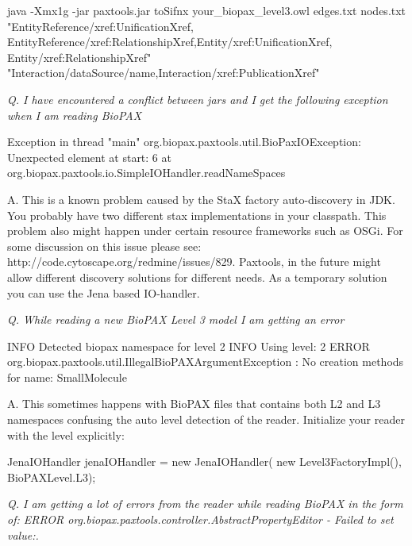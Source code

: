 \documentclass{tufte-book}
\begin{document}
\begin{xmlcode}
java -Xmx1g -jar paxtools.jar toSifnx your_biopax_level3.owl 
 edges.txt nodes.txt  "EntityReference/xref:UnificationXref,
EntityReference/xref:RelationshipXref,Entity/xref:UnificationXref,
Entity/xref:RelationshipXref"  
"Interaction/dataSource/name,Interaction/xref:PublicationXref"
\end{xmlcode}

\textit{Q. I have encountered a conflict between jars and I get the following exception when I am reading BioPAX}

\begin{fullwidth}
\begin{xmlcode}
Exception in thread "main" org.biopax.paxtools.util.BioPaxIOException:
Unexpected element at start: 6
    at org.biopax.paxtools.io.SimpleIOHandler.readNameSpaces
\end{xmlcode}
\end{fullwidth}

A. This is a known problem caused by the StaX factory auto-discovery in JDK. You probably have two different stax implementations in your classpath. This problem also might happen under certain resource frameworks such as OSGi. For some discussion on this issue please see: http://code.cytoscape.org/redmine/issues/829.  Paxtools, in the future might allow different discovery solutions for different needs. As a temporary solution you can use the Jena based IO-handler.

\textit{Q. While reading a new BioPAX Level 3 model I am getting an error}

\begin{fullwidth}
\begin{xmlcode}
INFO Detected biopax namespace for level 2
INFO Using level: 2
ERROR org.biopax.paxtools.util.IllegalBioPAXArgumentException
	: No creation methods for name: SmallMolecule 
\end{xmlcode}
\end{fullwidth}
A. This sometimes happens with BioPAX files that contains both L2 and L3 namespaces confusing the auto level detection of the reader. Initialize your reader with the level explicitly:

\begin{javacode}
 JenaIOHandler jenaIOHandler = 
  new JenaIOHandler(
   new Level3FactoryImpl(), BioPAXLevel.L3);
\end{javacode}


\textit{Q. I am getting a lot of errors from the reader while reading BioPAX in the form of: ERROR org.biopax.paxtools.controller.AbstractPropertyEditor  - Failed to set value:.}
\end{document}
